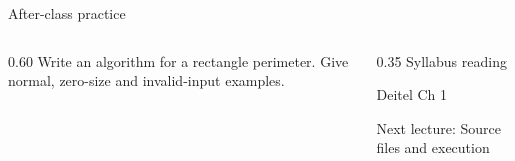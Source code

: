 \documentclass[10pt,aspectratio=169]{beamer}
\begin{document}
\begin{frame}[fragile,t]{After-class practice}
\begin{columns}[T,onlytextwidth]\begin{column}{0.60\textwidth}
Write an algorithm for a rectangle perimeter. Give normal, zero-size and invalid-input examples.
\end{column}\begin{column}{0.35\textwidth}\small
Syllabus reading\par Deitel Ch 1

Next lecture: Source files and execution
\end{column}\end{columns}
\end{frame}
\end{document}

